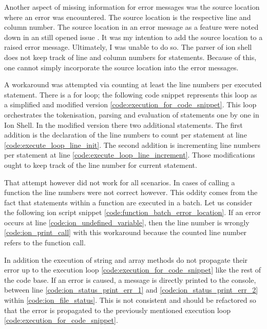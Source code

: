 Another aspect of missing information for error messages was the source location where an error was encountered.
The source location is the respective line and column number.
The source location in an error message as a feature were noted down
in an still opened issue \cite{issue_enrich_error_message_information} .
It was my intention to add the source location to a raised error message.
Ultimately, I was unable to do so.
The parser of ion shell does not keep track of line and column numbers for statements.
Because of this, one cannot simply incorporate the source location into the error messages.

A workaround was attempted via counting at least the line numbers per executed statement.
There is a for loop; the following code snippet represents this loop as a simplified and
modified version \ref{code:execution_for_code_snippet}.
This loop orchestrates the tokenisation, parsing and evaluation of statements one by one in Ion Shell.
In the modified version there two additional statements.
The first addition is the declaration of the line numbers
to count per statement at line \ref{code:execute_loop_line_init}.
The second addition is incrementing line numbers per statement at line \ref{code:execute_loop_line_increment}.
Those modifications ought to keep track of the line number for current statement.

\clearpage


That attempt however did not work for all scenarios.
In cases of calling a function the line numbers were not correct however.
This oddity comes from the fact that statements within a function are executed in a batch.
Let us consider the following ion script snippet \ref{code:function_batch_error_location}.
If an error occurs at line \ref{code:ion_undefined_variable},
then the line number is wrongly \ref{code:ion_print_call}
with this workaround because the counted line number refers to the function call.

\clearpage


In addition the execution of string and array methods do not propagate their error up
to the execution loop \ref{code:execution_for_code_snippet} like the rest of the code base.
If an error is caused, a message is directly printed to the console,
between line \ref{code:ion_status_print_err_1} and \ref{code:ion_status_print_err_2} within \ref{code:ion_file_status}.
This is not consistent and should be refactored so that the error is propagated
to the previously mentioned execution loop \ref{code:execution_for_code_snippet}.


